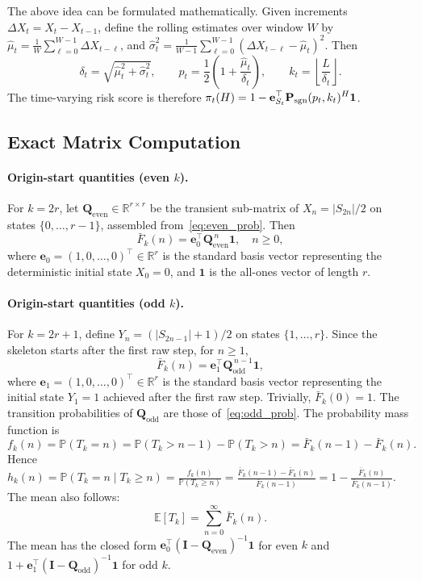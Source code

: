 \documentclass[pdflatex,sn-mathphys-num]{sn-jnl}
\theoremstyle{definition}
\newcommand{\Prob}{\mathbb{P}}
\newcommand{\E}{\mathbb{E}}
\numberwithin{equation}{section}
\begin{document}
The above idea can be formulated mathematically.
Given increments
$\displaystyle \Delta X_t=X_t-X_{t-1}$,
define the rolling estimates over window \(W\) by
$\displaystyle \hat\mu_t
=
\frac1W\sum_{\ell=0}^{W-1}\Delta X_{t-\ell}$,
and
$\displaystyle \hat\sigma_t^2
=
\frac1{W-1}\sum_{\ell=0}^{W-1}
(\Delta X_{t-\ell}-\hat\mu_t)^2$.
Then
\[
\delta_t=\sqrt{\hat\mu_t^2+\hat\sigma_t^2},
\qquad
p_t=\frac12\left(1+\frac{\hat\mu_t}{\delta_t}\right),
\qquad
k_t=\left\lfloor\frac{L}{\delta_t}\right\rfloor.
\]
The time-varying risk score is therefore
$\displaystyle \pi_t(H)
=
1-\mathbf e_{S_t}^\top
\mathbf P_{\rm sgn}(p_t,k_t)^H
\mathbf 1$.

\subsection{Exact Matrix Computation}\label{sec:matrix}

\paragraph{Origin-start quantities (even $k$).} For $k=2r$, let $\mathbf{Q}_{\mathrm{even}}\in\mathbb{R}^{r\times r}$ be the transient sub-matrix of $X_n=|S_{2n}|/2$ on states $\{0,\dots,r-1\}$, assembled from~\eqref{eq:even_prob}. Then
\begin{equation}\label{eq:surv_even}
\bar{F}_k(n) = \mathbf{e}_0^\top\mathbf{Q}_{\mathrm{even}}^{\,n}\mathbf{1},\quad n\ge 0,
\end{equation}
where $\mathbf{e}_0 = (1, 0, \dots, 0)^\top \in \mathbb{R}^r$ is the standard basis vector representing the deterministic initial state $X_0 = 0$, and $\mathbf{1}$ is the all-ones vector of length $r$.

\paragraph{Origin-start quantities (odd $k$).} For $k=2r+1$, define $Y_n=(|S_{2n-1}|+1)/2$ on states $\{1,\dots,r\}$. Since the skeleton starts after the first raw step, for $n\ge 1$,
\begin{equation}\label{eq:surv_odd}
\bar{F}_k(n) = \mathbf{e}_1^\top\mathbf{Q}_{\mathrm{odd}}^{\,n-1}\mathbf{1},
\end{equation}
where $\mathbf{e}_1 = (1, 0, \dots, 0)^\top \in \mathbb{R}^r$ is the standard basis vector representing the initial state $Y_1 = 1$ achieved after the first raw step. Trivially, $\bar{F}_k(0)=1$. The transition probabilities of $\mathbf{Q}_{\mathrm{odd}}$ are those of~\eqref{eq:odd_prob}. 
The probability mass function is
\[
f_k(n)=\Prob(T_k=n)
=
\Prob(T_k>n-1)-\Prob(T_k>n)
=
\bar F_k(n-1)-\bar F_k(n).
\]
Hence
$\displaystyle h_k(n)
=
\Prob(T_k=n\mid T_k\ge n)
=
\frac{f_k(n)}{\Prob(T_k\ge n)}
=
\frac{\bar F_k(n-1)-\bar F_k(n)}{\bar F_k(n-1)}
=
1-\frac{\bar F_k(n)}{\bar F_k(n-1)}$.
The mean also follows:
\begin{equation}\label{eq:haz_mean}
\E[T_k] = \sum_{n=0}^{\infty}\bar{F}_k(n).
\end{equation}
The mean has the closed form $\mathbf{e}_0^\top(\mathbf{I}-\mathbf{Q}_{\mathrm{even}})^{-1}\mathbf{1}$ for even $k$ and $1+\mathbf{e}_1^\top(\mathbf{I}-\mathbf{Q}_{\mathrm{odd}})^{-1}\mathbf{1}$ for odd $k$.
\end{document}
